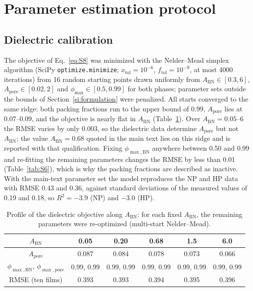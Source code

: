 \documentclass[10pt,a4paper]{article}
\newcommand{\Apore}{\ensuremath{A_{\mathrm{pore}}}}
\newcommand{\ABN}{\ensuremath{A_{\mathrm{BN}}}}
\newcommand{\phimax}{\ensuremath{\phi_{\max}}}
\begin{document}
\section{Parameter estimation protocol}
\label{si:paramest}

\subsection{Dielectric calibration}
\label{si:dielfit}
The objective of Eq.~\ref{eq:S8} was minimized with the Nelder--Mead simplex algorithm (SciPy \texttt{optimize.minimize}; $x_{\mathrm{tol}} = 10^{-6}$, $f_{\mathrm{tol}} = 10^{-9}$, at most 4000 iterations) from 16 random starting points drawn uniformly from $\ABN \in [0.3, 6]$, $\Apore \in [0.02, 2]$ and $\phimax \in [0.5, 0.99]$ for both phases; parameter sets outside the bounds of Section~\ref{si:formulation} were penalized. All starts converged to the same ridge: both packing fractions run to the upper bound of 0.99, \Apore{} lies at 0.07--0.09, and the objective is nearly flat in \ABN{} (Table~\ref{tab:S5}). Over $\ABN = 0.05$--6 the RMSE varies by only 0.003, so the dielectric data determine \Apore{} but not \ABN; the value $\ABN = 0.68$ quoted in the main text lies on this ridge and is reported with that qualification. Fixing $\phi_{\max,\mathrm{BN}}$ anywhere between 0.50 and 0.99 and re-fitting the remaining parameters changes the RMSE by less than 0.01 (Table~\ref{tab:S6}), which is why the packing fractions are described as inactive. With the main-text parameter set the model reproduces the NP and HP data with RMSE 0.43 and 0.36, against standard deviations of the measured values of 0.19 and 0.18, so $R^2 = -3.9$ (NP) and $-3.0$ (HP).

\begin{table}[htbp]
\centering
\caption{Profile of the dielectric objective along \ABN: for each fixed \ABN, the remaining parameters were re-optimized (multi-start Nelder--Mead).}
\label{tab:S5}
\small
\begin{tabular}{@{}cccccc@{}}
\toprule
\ABN & 0.05 & 0.20 & 0.68 & 1.5 & 6.0 \\
\midrule
\Apore & 0.087 & 0.084 & 0.078 & 0.073 & 0.066 \\
$\phi_{\max,\mathrm{BN}}$, $\phi_{\max,\mathrm{pore}}$ & 0.99, 0.99 & 0.99, 0.99 & 0.99, 0.99 & 0.99, 0.99 & 0.99, 0.99 \\
RMSE (ten films) & 0.393 & 0.393 & 0.394 & 0.395 & 0.396 \\
\bottomrule
\end{tabular}
\end{table}
\end{document}
